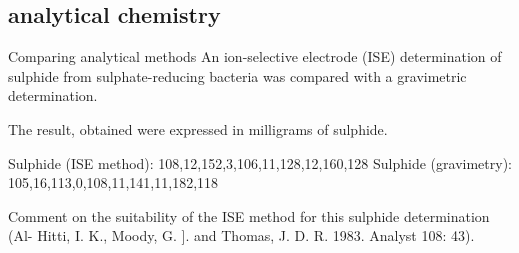\subsection*{analytical chemistry}
Comparing analytical methods 
An ion-selective electrode (ISE) determination of sulphide from sulphate-reducing bacteria was compared with a gravimetric determination. 

The result, obtained were expressed in milligrams of sulphide.

Sulphide (ISE method): 108,12,152,3,106,11,128,12,160,128
Sulphide (gravimetry): 105,16,113,0,108,11,141,11,182,118

Comment on the suitability of the ISE method for this sulphide determination (Al-
Hitti, I. K., Moody, G. ]. and Thomas, J. D. R. 1983. Analyst 108: 43).
